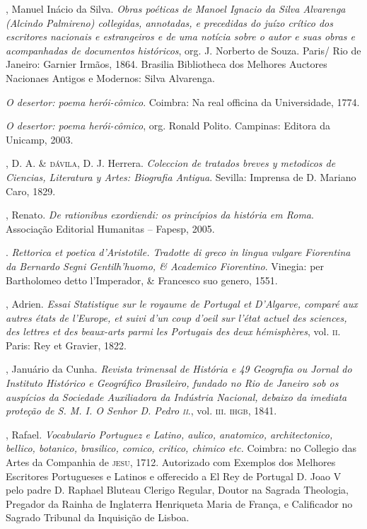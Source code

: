 \begin{bibliohedra}
, Manuel Inácio da Silva. \emph{Obras poéticas de Manoel
Ignacio da Silva Alvarenga (Alcindo Palmireno) collegidas, annotadas, e precedidas do juízo crítico dos escritores nacionais e
estrangeiros e de uma notícia sobre o autor e suas obras e acompanhadas de documentos históricos}, org. J. Norberto de Souza.
Paris/ Rio de Janeiro: Garnier Irmãos, 1864. Brasilia Bibliotheca dos Melhores Auctores Nacionaes Antigos e Modernos:
Silva Alvarenga.

 \emph{O desertor: poema herói-cômico}. Coimbra: Na real
officina da Universidade, 1774.

 \emph{O desertor: poema herói-cômico}, org. Ronald Polito.
Campinas: Editora da Unicamp, 2003.

, D. A. \& \textsc{dávila}, D. J. Herrera. \emph{Coleccion de tratados
breves y metodicos de Ciencias, Literatura y Artes: Biografia
Antigua}. Sevilla: Imprensa de D. Mariano Caro, 1829.

, Renato. \emph{De rationibus exordiendi: os princípios da
história em Roma}. Associação Editorial Humanitas – Fapesp,
2005.

. \emph{Rettorica et poetica d’Aristotile. Tradotte di greco
in lingua vulgare Fiorentina da Bernardo Segni Gentilh’huomo,
\& Academico Fiorentino}. Vinegia: per Bartholomeo detto
l’Imperador, \& Francesco suo genero, 1551.

, Adrien. \emph{Essai Statistique sur le royaume de Portugal et
D’Algarve, comparé aux autres états de l’Europe, et suivi d’un
coup d’oeil sur l’état actuel des sciences, des lettres et des beaux-arts parmi les Portugais des deux hémisphères}, vol. \textsc{ii}. Paris: Rey et Gravier, 1822.

, Januário da Cunha. \emph{Revista trimensal de História e 49
Geografia ou Jornal do Instituto Histórico e Geográfico Brasileiro, fundado no Rio de Janeiro sob os auspícios da Sociedade
Auxiliadora da Indústria Nacional, debaixo da imediata proteção
de S. M. I. O Senhor D. Pedro \textsc{ii}}., vol. \textsc{iii}. \textsc{ihgb}, 1841.

, Rafael. \emph{Vocabulario Portuguez e Latino, aulico, anatomico, architectonico, bellico, botanico, brasilico, comico, critico,
chimico etc.} Coimbra: no Collegio das Artes da Companhia de
\textsc{jesu}, 1712. Autorizado com Exemplos dos Melhores Escritores
Portugueses e Latinos e offerecido a El Rey de Portugal D. Joao
V pelo padre D. Raphael Bluteau Clerigo Regular, Doutor na
Sagrada Theologia, Pregador da Rainha de Inglaterra Henriqueta Maria de França, e Calificador no Sagrado Tribunal da
Inquisição de Lisboa.


\end{bibliohedra}

